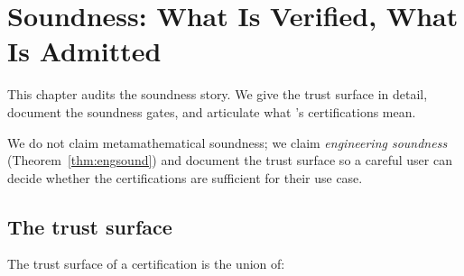 \chapter{Soundness: What Is Verified, What Is Admitted}
\label{ch:soundness}

This chapter audits the soundness story.  We give the trust surface
in detail, document the soundness gates, and articulate what
\Deppy{}'s certifications mean.

We do not claim metamathematical soundness; we claim
\emph{engineering soundness} (Theorem~\ref{thm:engsound}) and
document the trust surface so a careful user can decide whether
the certifications are sufficient for their use case.

\section{The trust surface}
\label{sec:trust-surface}

The trust surface of a \Deppy{} certification is the union of:

